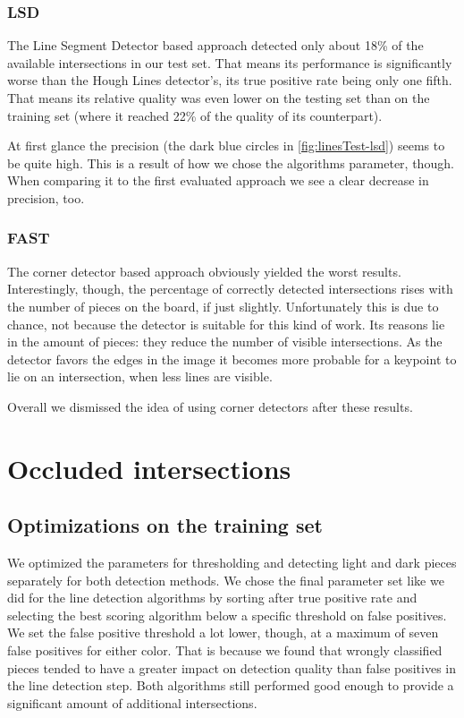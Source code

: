 	\subsubsection{LSD}
	\label{evaluation-visible-performance-lsd}
	The Line Segment Detector based approach detected only about 18\% of the available intersections in our test set. That means its performance is significantly worse than the Hough Lines detector's, its true positive rate being only one fifth. That means its relative quality was even lower on the testing set than on the training set (where it reached 22\% of the quality of its counterpart).

	At first glance the precision (the dark blue circles in \autoref{fig:linesTest-lsd}) seems to be quite high. This is a result of how we chose the algorithms parameter, though. When comparing it to the first evaluated approach we see a clear decrease in precision, too.

	\subsubsection{FAST}
	\label{evaluation-visible-performance-fast}
	The corner detector based approach obviously yielded the worst results. Interestingly, though, the percentage of correctly detected intersections rises with the number of pieces on the board, if just slightly. Unfortunately this is due to chance, not because the detector is suitable for this kind of work. Its reasons lie in the amount of pieces: they reduce the number of visible intersections. As the detector favors the edges in the image it becomes more probable for a keypoint to lie on an intersection, when less lines are visible.

	Overall we dismissed the idea of using corner detectors after these results.
	





	\section{Occluded intersections}
	\label{evaluation-occluded}
	\subsection{Optimizations on the training set}
	\label{evaluation-occluded-optimization}
	We optimized the parameters for thresholding and detecting light and dark pieces separately for both detection methods. We chose the final parameter set like we did for the line detection algorithms by sorting after true positive rate and selecting the best scoring algorithm below a specific threshold on false positives. We set the false positive threshold a lot lower, though, at a maximum of seven false positives for either color. That is because we found that wrongly classified pieces tended to have a greater impact on detection quality than false positives in the line detection step. Both algorithms still performed good enough to provide a significant amount of additional intersections.

